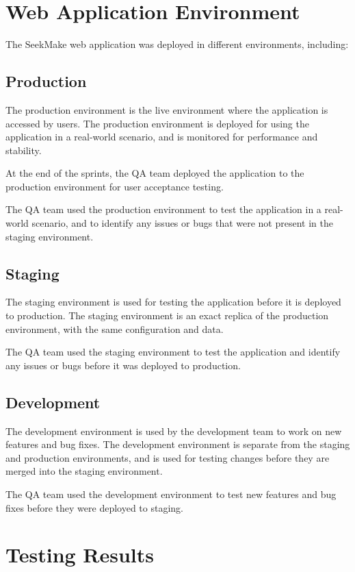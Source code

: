 \section{Web Application Environment}

The SeekMake web application was deployed in different environments, including:

\subsection{Production}

The production environment is the live environment where the application is accessed by users. The production environment is deployed for using the application in a real-world scenario, and is monitored for performance and stability.

At the end of the sprints, the QA team deployed the application to the production environment for user acceptance testing.

The QA team used the production environment to test the application in a real-world scenario, and to identify any issues or bugs that were not present in the staging environment.

\subsection{Staging}

The staging environment is used for testing the application before it is deployed to production. The staging environment is an exact replica of the production environment, with the same configuration and data.

The QA team used the staging environment to test the application and identify any issues or bugs before it was deployed to production.

\subsection{Development}

The development environment is used by the development team to work on new features and bug fixes. The development environment is separate from the staging and production environments, and is used for testing changes before they are merged into the staging environment.

The QA team used the development environment to test new features and bug fixes before they were deployed to staging.

\section{Testing Results}

